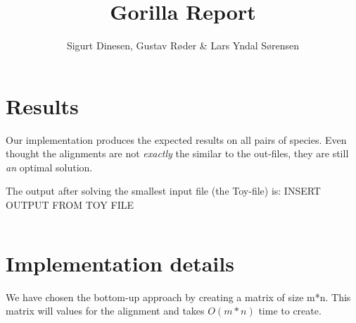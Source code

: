 \documentclass{tufte-handout}
\title{Gorilla Report}
\author{Sigurt Dinesen, Gustav Røder \& Lars Yndal Sørensen}
\begin{document}
  \maketitle

  \section{Results}
	Our implementation produces the expected results on all pairs of species. Even thought the alignments are not \textit{exactly} the similar to the out-files, they are still \textit{an} optimal solution.
	
	The output after solving the smallest input file (the Toy-file) is:
  {\color{red} INSERT OUTPUT FROM TOY FILE}
  \begin{fullwidth}\small
  	\begin{verbatim}
   \end{verbatim}
\end{fullwidth}


  \section{Implementation details}
	We have chosen the bottom-up approach by creating a matrix of size m*n. This matrix will values for the alignment and takes $O(m*n)$ time to create.
\end{document}
